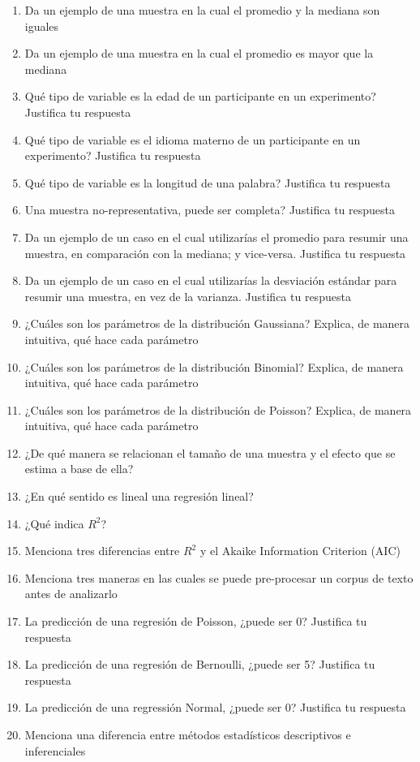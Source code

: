 \documentclass[
]{article}
\providecommand{\tightlist}{%
  \setlength{\itemsep}{0pt}\setlength{\parskip}{0pt}}
\begin{document}
\begin{enumerate}
\def\labelenumi{\arabic{enumi}.}
\tightlist
\item
  Da un ejemplo de una muestra en la cual el promedio y la mediana son
  iguales
\item
  Da un ejemplo de una muestra en la cual el promedio es mayor que la
  mediana
\item
  Qué tipo de variable es la edad de un participante en un experimento?
  Justifica tu respuesta
\item
  Qué tipo de variable es el idioma materno de un participante en un
  experimento? Justifica tu respuesta
\item
  Qué tipo de variable es la longitud de una palabra? Justifica tu
  respuesta
\item
  Una muestra no-representativa, puede ser completa? Justifica tu
  respuesta
\item
  Da un ejemplo de un caso en el cual utilizarías el promedio para
  resumir una muestra, en comparación con la mediana; y vice-versa.
  Justifica tu respuesta
\item
  Da un ejemplo de un caso en el cual utilizarías la desviación estándar
  para resumir una muestra, en vez de la varianza. Justifica tu
  respuesta
\item
  ¿Cuáles son los parámetros de la distribución Gaussiana? Explica, de
  manera intuitiva, qué hace cada parámetro
\item
  ¿Cuáles son los parámetros de la distribución Binomial? Explica, de
  manera intuitiva, qué hace cada parámetro
\item
  ¿Cuáles son los parámetros de la distribución de Poisson? Explica, de
  manera intuitiva, qué hace cada parámetro
\item
  ¿De qué manera se relacionan el tamaño de una muestra y el efecto que
  se estima a base de ella?
\item
  ¿En qué sentido es lineal una regresión lineal?
\item
  ¿Qué indica \(R^2\)?
\item
  Menciona tres diferencias entre \(R^2\) y el Akaike Information
  Criterion (AIC)
\item
  Menciona tres maneras en las cuales se puede pre-procesar un corpus de
  texto antes de analizarlo
\item
  La predicción de una regresión de Poisson, ¿puede ser 0? Justifica tu
  respuesta
\item
  La predicción de una regresión de Bernoulli, ¿puede ser 5? Justifica
  tu respuesta
\item
  La predicción de una regressión Normal, ¿puede ser 0? Justifica tu
  respuesta
\item
  Menciona una diferencia entre métodos estadísticos descriptivos e
  inferenciales
\end{enumerate}
\end{document}
